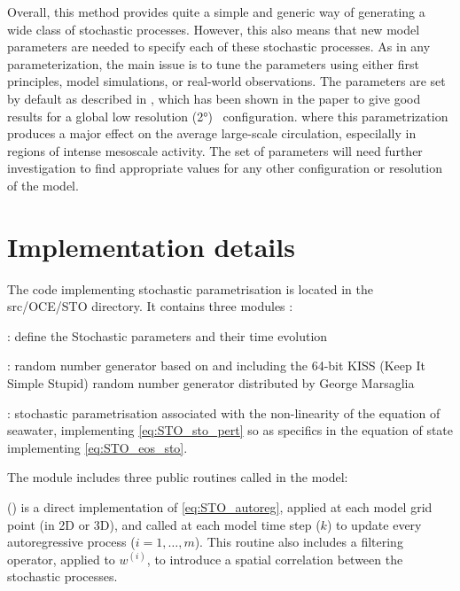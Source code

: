 \documentclass[../main/NEMO_manual]{subfiles}
\begin{document}
Overall, this method provides quite a simple and generic way of generating a wide class of stochastic processes.
However, this also means that new model parameters are needed to specify each of these stochastic processes.
As in any parameterization, the main issue is to tune the parameters using
either first principles, model simulations, or real-world observations.
The parameters are set by default as described in \cite{brankart_OM13}, which has been shown in the paper
to give good results for a global low resolution (2°) \NEMO\ configuration. where this parametrization produces a major effect on the average large-scale circulation, especilally in regions of intense mesoscale activity.
The set of parameters will need further investigation to find appropriate values
for any other configuration or resolution of the model.

\section{Implementation details}
\label{sec:STO_thech_details}

The code implementing stochastic parametrisation is located in the src/OCE/STO directory.
It contains three modules :

 : define the Stochastic parameters and their time evolution

 : random number generator based on and including the 64-bit KISS (Keep It Simple Stupid) random number generator distributed by George Marsaglia

 : stochastic parametrisation associated with the non-linearity of the equation of
 seawater, implementing \autoref{eq:STO_sto_pert} so as specifics in the equation of state
 implementing \autoref{eq:STO_eos_sto}.

The  module includes three public routines called in the model:

() is a direct implementation of \autoref{eq:STO_autoreg},
applied at each model grid point (in 2D or 3D), and called at each model time step ($k$) to
update every autoregressive process ($i=1,\ldots,m$).
This routine also includes a filtering operator, applied to $w^{(i)}$,
to introduce a spatial correlation between the stochastic processes.
\end{document}
